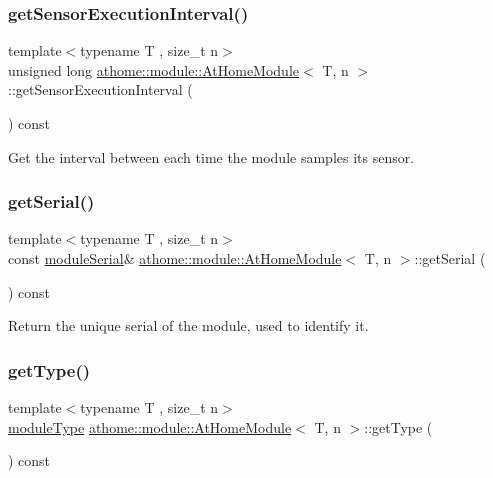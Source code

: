 \subsubsection{\texorpdfstring{get\+Sensor\+Execution\+Interval()}{getSensorExecutionInterval()}}
{\footnotesize\ttfamily template$<$typename T , size\+\_\+t n$>$ \\
unsigned long \mbox{\hyperlink{classathome_1_1module_1_1_at_home_module}{athome\+::module\+::\+At\+Home\+Module}}$<$ T, n $>$\+::get\+Sensor\+Execution\+Interval (\begin{DoxyParamCaption}{ }\end{DoxyParamCaption}) const\hspace{0.3cm}{\ttfamily [inline]}}

Get the interval between each time the module samples its sensor. \mbox{\label{classathome_1_1module_1_1_at_home_module_a783ba85ff4b0c77e67073342cfdae82c}} 
\subsubsection{\texorpdfstring{get\+Serial()}{getSerial()}}
{\footnotesize\ttfamily template$<$typename T , size\+\_\+t n$>$ \\
const \mbox{\hyperlink{classathome_1_1module_1_1_at_home_module_aff47a5cb8ee94041eb42fa673dea7a81}{module\+Serial}}\& \mbox{\hyperlink{classathome_1_1module_1_1_at_home_module}{athome\+::module\+::\+At\+Home\+Module}}$<$ T, n $>$\+::get\+Serial (\begin{DoxyParamCaption}{ }\end{DoxyParamCaption}) const\hspace{0.3cm}{\ttfamily [inline]}}

Return the unique serial of the module, used to identify it. \mbox{\label{classathome_1_1module_1_1_at_home_module_a1d79645c2471440383fa935b48264d89}} 
\subsubsection{\texorpdfstring{get\+Type()}{getType()}}
{\footnotesize\ttfamily template$<$typename T , size\+\_\+t n$>$ \\
\mbox{\hyperlink{classathome_1_1module_1_1_at_home_module_a5075522baeaab0de681c26a5e5f18cd3}{module\+Type}} \mbox{\hyperlink{classathome_1_1module_1_1_at_home_module}{athome\+::module\+::\+At\+Home\+Module}}$<$ T, n $>$\+::get\+Type (\begin{DoxyParamCaption}{ }\end{DoxyParamCaption}) const\hspace{0.3cm}{\ttfamily [inline]}}

